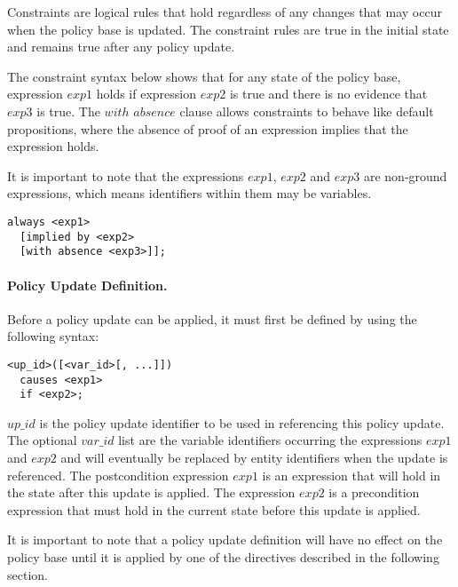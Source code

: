 \documentclass{llncs}
\begin{document}
          Constraints are logical rules that hold regardless of any changes
          that may occur when the policy base is updated. The constraint rules
          are true in the initial state and remains true after any policy
          update.

          The constraint syntax below shows that for any state of the policy
          base, expression $exp1$ holds if expression $exp2$ is true and there
          is no evidence that $exp3$ is true. The $with$ $absence$ clause
          allows constraints to behave like default propositions, where the
          absence of proof of an expression implies that the expression holds.

          It is important to note that the expressions $exp1$, $exp2$ and
          $exp3$ are non-ground expressions, which means identifiers within
          them may be variables.

          \begin{verbatim}always <exp1>
  [implied by <exp2>
  [with absence <exp3>]];\end{verbatim}

        \paragraph{\bf Policy Update Definition.}

          Before a policy update can be applied, it must first be defined by
          using the following syntax:

          \begin{verbatim}<up_id>([<var_id>[, ...]])
  causes <exp1>
  if <exp2>;\end{verbatim}

          $up\_id$ is the policy update identifier to be used in referencing
          this policy update. The optional $var\_id$ list are the variable
          identifiers occurring the expressions $exp1$ and $exp2$ and will
          eventually be replaced by entity identifiers when the update is
          referenced. The postcondition expression $exp1$ is an expression that
          will hold in the state after this update is applied. The expression
          $exp2$ is a precondition expression that must hold in the current
          state before this update is applied.

          It is important to note that a policy update definition will have no
          effect on the policy base until it is applied by one of the
          directives described in the following section.
\end{document}
